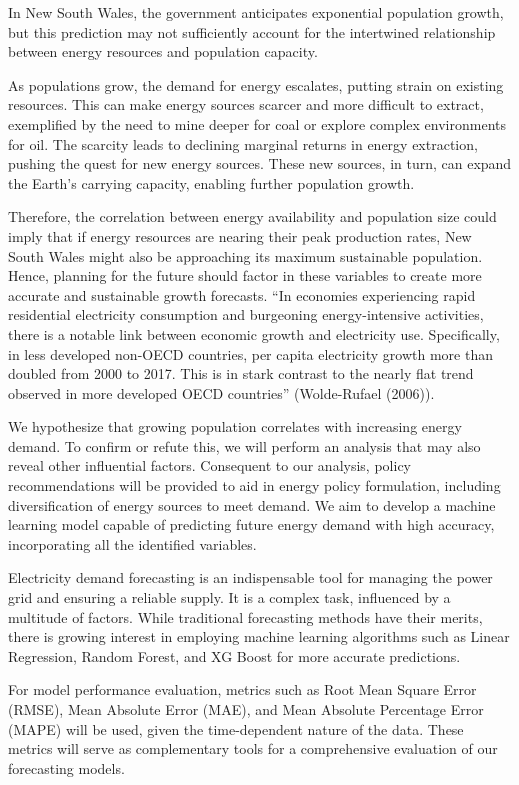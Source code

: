 \documentclass[mstat,12pt]{unswthesis}
\begin{document}
In New South Wales, the government anticipates exponential population
growth, but this prediction may not sufficiently account for the
intertwined relationship between energy resources and population
capacity.

As populations grow, the demand for energy escalates, putting strain on
existing resources. This can make energy sources scarcer and more
difficult to extract, exemplified by the need to mine deeper for coal or
explore complex environments for oil. The scarcity leads to declining
marginal returns in energy extraction, pushing the quest for new energy
sources. These new sources, in turn, can expand the Earth's carrying
capacity, enabling further population growth.

Therefore, the correlation between energy availability and population
size could imply that if energy resources are nearing their peak
production rates, New South Wales might also be approaching its maximum
sustainable population. Hence, planning for the future should factor in
these variables to create more accurate and sustainable growth
forecasts. ``In economies experiencing rapid residential electricity
consumption and burgeoning energy-intensive activities, there is a
notable link between economic growth and electricity use. Specifically,
in less developed non-OECD countries, per capita electricity growth more
than doubled from 2000 to 2017. This is in stark contrast to the nearly
flat trend observed in more developed OECD countries'' (Wolde-Rufael
(2006)).

We hypothesize that growing population correlates with increasing energy
demand. To confirm or refute this, we will perform an analysis that may
also reveal other influential factors. Consequent to our analysis,
policy recommendations will be provided to aid in energy policy
formulation, including diversification of energy sources to meet demand.
We aim to develop a machine learning model capable of predicting future
energy demand with high accuracy, incorporating all the identified
variables.

Electricity demand forecasting is an indispensable tool for managing the
power grid and ensuring a reliable supply. It is a complex task,
influenced by a multitude of factors. While traditional forecasting
methods have their merits, there is growing interest in employing
machine learning algorithms such as Linear Regression, Random Forest,
and XG Boost for more accurate predictions.

For model performance evaluation, metrics such as Root Mean Square Error
(RMSE), Mean Absolute Error (MAE), and Mean Absolute Percentage Error
(MAPE) will be used, given the time-dependent nature of the data. These
metrics will serve as complementary tools for a comprehensive evaluation
of our forecasting models.
\end{document}
